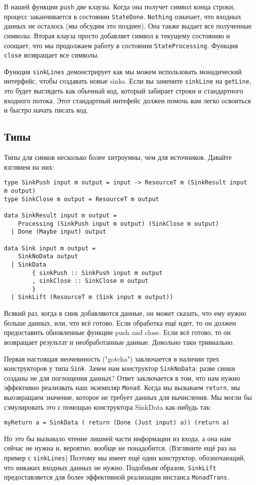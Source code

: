 В нашей функции \lstinline=push= две клаузы. Когда она получет символ конца строки,
процесс заканчивается в состоянии \lstinline=StateDone=. \lstinline=Nothing= означает, что
входных данных не
осталось (мы обсудим это позднее). Она также выдает все полученные символы. Вторая
клауза просто добавляет символ к текущему состоянию и соощает, что мы продолжаем работу
в состоянии \lstinline=StateProcessing=. Функция \lstinline=close= возвращает все символы.

Функция \lstinline=sinkLines= демонстрирует как мы можем использовать монадический
интерфейс, чтобы создавать новые sinks. Если вы замените \lstinline=sinkLine= на
\lstinline=getLine=, это будет выглядеть
как обычный код, который забирает строки и стандартного входного потока. Этот
стандартный интефейс должен помочь вам легко освоиться и быстро начать писать код.

\subsection{Типы}

Типы для синков несколько более хитроумны, чем для источников. Давайте взглянем на них:
\begin{lstlisting}
type SinkPush input m output = input -> ResourceT m (SinkResult input m output)
type SinkClose m output = ResourceT m output

data SinkResult input m output =
    Processing (SinkPush input m output) (SinkClose m output)
  | Done (Maybe input) output

data Sink input m output =
    SinkNoData output
  | SinkData
        { sinkPush :: SinkPush input m output
        , sinkClose :: SinkClose m output
        }
  | SinkLift (ResourceT m (Sink input m output))
\end{lstlisting}  
Всякий раз, когда в синк добавляются данные, он может сказать, что ему нужно больше
данных, или, что всё готово. Если обработка ещё идет, то он должен предоставить
обновленные функции push and close. Если всё готово, то он возвращает результат и
необработанные данные. Довольно таки тривиально.
 
Первая настоящая неочевиность ("gotcha") заключается в наличии трех конструкторов у
типа \lstinline=Sink=. Зачем нам конструктор \lstinline=SinkNoData=: разве синки
созданы не для поглощения данных? Ответ заключается в том, что нам нужно эффективно
реализвать наш экземпляр \lstinline=Monad=. Когда мы вызываем \lstinline=return=, мы
выозвращаем значение, которое не требует данных для вычисления. Мы могли бы сэмулировать
это с помощью конструктора SinkData как-нибудь так:
\begin{lstlisting}
myReturn a = SinkData ( return (Done (Just input) a)) (return a)
\end{lstlisting}
Но это бы вызывало чтение лишней части информации из входа, а она нам сейчас не нужна и,
вероятно, вообще не понадобится. (Взгляните ещё раз на пример с \lstinline=sinkLines=)
Поэтому мы имеет ещё один конструктор, обозночающий, что никаких входных данных не нужно.
Подобным образом, \lstinline=SinkLift= предоставляется для более эффективной реализации
инстанса \lstinline=MonadTrans=.

